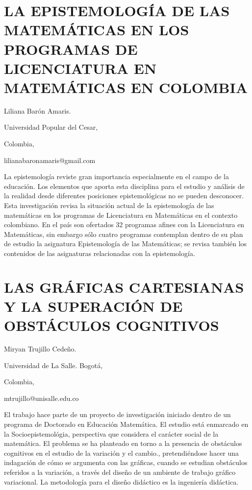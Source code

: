 \section{LA EPISTEMOLOGÍA DE LAS MATEMÁTICAS EN LOS PROGRAMAS DE LICENCIATURA
EN MATEMÁTICAS EN COLOMBIA}

\begin{datos}

Liliana Barón Amaris.

Universidad Popular del Cesar, 

Colombia,

lilianabaronamaris@gmail.com

\end{datos}

La epistemología reviste gran importancia especialmente en el campo
de la educación. Los elementos que aporta esta disciplina para el
estudio y análisis de la realidad desde diferentes posiciones epistemológicas
no se pueden desconocer. Esta investigación revisa la situación actual
de la epistemología de las matemáticas en los programas de Licenciatura
en Matemáticas en el contexto colombiano. En el país son ofertados
32 programas afines con la Licenciatura en Matemáticas, sin embargo
sólo cuatro programas contemplan dentro de su plan de estudio la asignatura
Epistemología de las Matemáticas; se revisa también los contenidos
de las asignaturas relacionadas con la epistemología.


\section{LAS GRÁFICAS CARTESIANAS Y LA SUPERACIÓN DE OBSTÁCULOS COGNITIVOS}

\begin{datos}

Miryan Trujillo Cedeño. 

Universidad de La Salle. Bogotá,

Colombia,

mtrujillo@unisalle.edu.co

\end{datos}

El trabajo hace parte de un proyecto de investigación iniciado dentro
de un programa de Doctorado en Educación Matemática. El estudio está
enmarcado en la Socioepistemológia, perspectiva que considera el carácter
social de la matemática. El problema se ha planteado en torno a la
presencia de obstáculos cognitivos en el estudio de la variación y
el cambio., pretendiéndose hacer una indagación de cómo se argumenta
con las gráficas, cuando se estudian obstáculos referidos a la variación,
a través del diseño de un ambiente de trabajo gráfico variacional.
La metodología para el diseño didáctico es la ingeniería didáctica. 

